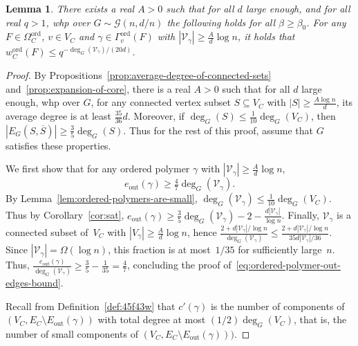 \documentclass[11pt]{article}
\theoremstyle{plain}
\newtheorem{lemma}[theorem]{Lemma}
\newcommand{\G}{\mathcal{G}}
\newcommand{\V}{\mathcal{V}}
\newcommand{\Vin}{\V_\gamma}
\newcommand{\out}{\mathrm{out}}
\newcommand{\1}{\mathbb{1}}
\newcommand{\ord}{\mathrm{ord}}
\begin{document}
\begin{lemma}\label{lem:weight-decaying-for-large-polymers}
    There exists a real \(A > 0\) such that for all \(d\) large enough, and for all real \(q > 1\), whp over \(G\sim\G(n,d/n)\) the following holds for all \(\beta \geq \beta_0\). 
    For any \(F\in\Omega^\ord_C\), \(v\in V_C\) and \(\gamma\in\Gamma_v^\ord(F)\) with \(|\Vin|\geq\frac{A}{d}\log n\), 
 it holds that $w^\ord_C(F) \leq q^{-\deg_G(\V_\gamma)/(20d)}$.
\end{lemma}
\begin{proof}
    By Propositions~\ref{prop:average-degree-of-connected-sets} and~\ref{prop:expansion-of-core}, there is a real \(A > 0\) such that for all \(d\) large enough, whp over \(G\), for any connected vertex subset \(S\subseteq V_C\)  with \(|S|\geq \frac{A\log n}{d}\),  its average degree is at least \(\frac{35}{36}d\). Moreover,  if \(\deg_G(S)\leq\tfrac{1}{10}\deg_G(V_C)\), then \(|E_G(S,\overline{S})|\geq\tfrac 35\deg_G(S)\). Thus for the rest of this proof, assume that \(G\) satisfies these properties. 
    
    We first show that for any ordered polymer \(\gamma\) with \(|\V_\gamma|\geq\frac{A}{d}\log n\),  \begin{equation}\label{eq:ordered-polymer-out-edges-bound}
        e_\out(\gamma)\geq \tfrac{4}{7}\deg_G(\V_\gamma).
    \end{equation}    
    By Lemma~\ref{lem:ordered-polymers-are-small}, \(\deg_G(\V_\gamma)\leq \tfrac{1}{10}\deg_G(V_C)\). Thus  by Corollary~\ref{cor:sat}, \(e_\out(\gamma)\geq\tfrac 35\deg_G(\V_\gamma) - 2 - \frac{d|\V_\gamma|}{\log n}\). Finally, \(\V_\gamma\) is a connected subset of~$V_C$
   with $|V_\gamma| \geq \tfrac{A}{d} \log n$,   hence \(\frac{2+d|\V_\gamma|/\log n}{\deg_G(\V_\gamma)} \leq \frac{2+d|\V_\gamma|/\log n}{35d|\Vin|/36}\). Since  \(|\Vin|=\Omega(\log n)\), 
this fraction is at most~$1/35$ for sufficiently large~$n$. Thus,   
 \(\frac{e_\out(\gamma)}{\deg_G(\V_\gamma)}\geq\tfrac35-\tfrac{1}{35} = \tfrac{4}{7}\), concluding the proof of~\eqref{eq:ordered-polymer-out-edges-bound}.

Recall 
from Definition~\ref{def:45f43w}
that \(c'(\gamma)\) is the number of  components of \((V_C, E_C\setminus E_\out(\gamma))\) with total degree at most $(1/2) \deg_G(V_C)$, that is, the number of small components of \((V_C, E_C\setminus E_\out(\gamma)))\).


\end{proof}
\end{document}

